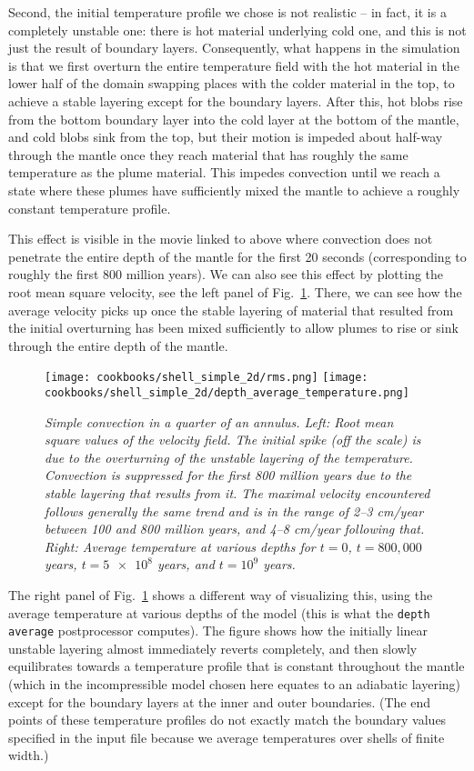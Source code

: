 \documentclass{article}
\begin{document}
Second, the initial temperature profile we chose is not realistic -- in fact, it
is a completely unstable one: there is hot material underlying cold one, and
this is not just the result of boundary layers. Consequently, what happens in
the simulation is that we first overturn the entire temperature field with the
hot material in the lower half of the domain swapping places with the colder
material in the top, to achieve a stable layering except for the boundary
layers. After this, hot blobs rise from the bottom boundary layer into the cold
layer at the bottom of the mantle, and cold blobs sink from the top, but their
motion is impeded about half-way through the mantle once they reach material
that has roughly the same temperature as the plume material. This impedes
convection until we reach a state where these plumes have sufficiently mixed the
mantle to achieve a roughly constant temperature profile.

This effect is visible in the movie linked to above where convection does not
penetrate the entire depth of the mantle for the first 20 seconds
(corresponding to roughly the first 800 million years). We can also see this
effect by plotting the root mean square velocity, see the left panel of
Fig.~\ref{fig:simple-shell-2d-rms}. There, we can see how the average velocity
picks up once the stable layering of material that resulted from the initial
overturning has been mixed sufficiently to allow plumes to rise or sink through
the entire depth of the mantle.

\begin{figure}[tb]
\texttt{[image: cookbooks/shell\_simple\_2d/rms.png]}
\hfill
\texttt{[image: cookbooks/shell\_simple\_2d/depth\_average\_temperature.png]}
\caption{\it Simple convection in a quarter of an annulus. Left: Root mean
square values of the velocity field. The initial spike (off the scale) is due to
the overturning of the unstable layering of the temperature. Convection is suppressed for the
first 800 million years due to the stable layering that results from it. The
maximal velocity encountered follows generally the same trend and is in the
range of 2--3 cm/year between 100 and 800 million years, and 4--8 cm/year
following that. Right: Average temperature at various depths for $t=0$,
$t=800,000$ years, $t=\num{5e8}$ years, and $t=10^9$ years.}
\label{fig:simple-shell-2d-rms}
\end{figure}

The right panel of Fig.~\ref{fig:simple-shell-2d-rms} shows a different way of
visualizing this, using the average temperature at various depths of the model
(this is what the \texttt{depth average} postprocessor computes). The figure
shows how the initially linear unstable layering almost immediately reverts
completely, and then slowly equilibrates towards a temperature profile that is
constant throughout the mantle (which in the incompressible model chosen here
equates to an adiabatic layering) except for the boundary layers at the inner
and outer boundaries. (The end points of these temperature profiles do not
exactly match the boundary values specified in the input file because we
average temperatures over shells of finite width.)
\end{document}

